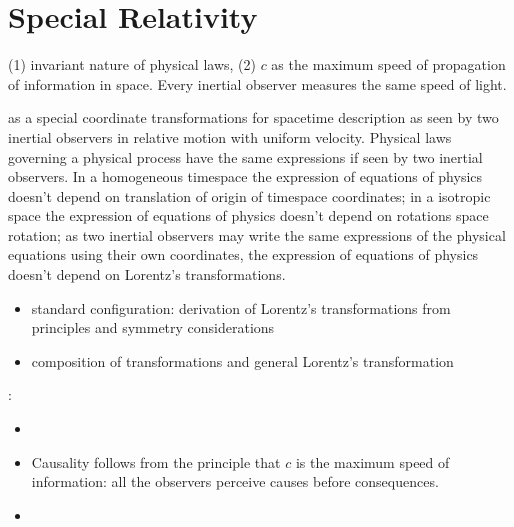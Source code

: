 \documentclass[letterpaper,10pt,english]{jupyterBook}
\begin{document}
\sphinxstepscope


\chapter{Special Relativity}
\label{\detokenize{ch/relativity-special/intro:special-relativity}}\label{\detokenize{ch/relativity-special/intro:relativity-special}}\label{\detokenize{ch/relativity-special/intro::doc}}
\sphinxAtStartPar
{} (1) invariant nature of physical laws, (2) \(c\) as the maximum speed of propagation of information in space. Every inertial observer measures the same speed of light.

\sphinxAtStartPar
{} as a special coordinate transformations for space\sphinxhyphen{}time description as seen by two inertial observers in relative motion with uniform velocity. Physical laws governing a physical process have the same expressions if seen by two inertial observers. In a homogeneous time\sphinxhyphen{}space the expression of equations of physics doesn’t depend on translation of origin of time\sphinxhyphen{}space coordinates; in a isotropic space the expression of equations of physics doesn’t depend on rotations space rotation; as two inertial observers may write the same expressions of the physical equations using their own coordinates, the expression of equations of physics doesn’t depend on Lorentz’s transformations.
\begin{itemize}
\item {} 
\sphinxAtStartPar
standard configuration: derivation of Lorentz’s transformations from principles and symmetry considerations

\item {} 
\sphinxAtStartPar
composition of transformations and general Lorentz’s transformation

\end{itemize}

\sphinxAtStartPar
{}:
\begin{itemize}
\item {} 
\sphinxAtStartPar
{}

\item {} 
\sphinxAtStartPar
{} Causality follows from the principle that \(c\) is the maximum speed of information: all the observers perceive causes before consequences.

\item {} 
\sphinxAtStartPar
{}

\end{itemize}
\end{document}
